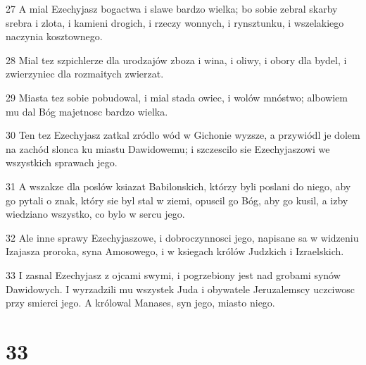 \par 27 A mial Ezechyjasz bogactwa i slawe bardzo wielka; bo sobie zebral skarby srebra i zlota, i kamieni drogich, i rzeczy wonnych, i rynsztunku, i wszelakiego naczynia kosztownego.
\par 28 Mial tez szpichlerze dla urodzajów zboza i wina, i oliwy, i obory dla bydel, i zwierzyniec dla rozmaitych zwierzat.
\par 29 Miasta tez sobie pobudowal, i mial stada owiec, i wolów mnóstwo; albowiem mu dal Bóg majetnosc bardzo wielka.
\par 30 Ten tez Ezechyjasz zatkal zródlo wód w Gichonie wyzsze, a przywiódl je dolem na zachód slonca ku miastu Dawidowemu; i szczescilo sie Ezechyjaszowi we wszystkich sprawach jego.
\par 31 A wszakze dla poslów ksiazat Babilonskich, którzy byli poslani do niego, aby go pytali o znak, który sie byl stal w ziemi, opuscil go Bóg, aby go kusil, a izby wiedziano wszystko, co bylo w sercu jego.
\par 32 Ale inne sprawy Ezechyjaszowe, i dobroczynnosci jego, napisane sa w widzeniu Izajasza proroka, syna Amosowego, i w ksiegach królów Judzkich i Izraelskich.
\par 33 I zasnal Ezechyjasz z ojcami swymi, i pogrzebiony jest nad grobami synów Dawidowych. I wyrzadzili mu wszystek Juda i obywatele Jeruzalemscy uczciwosc przy smierci jego. A królowal Manases, syn jego, miasto niego.

\chapter{33}

